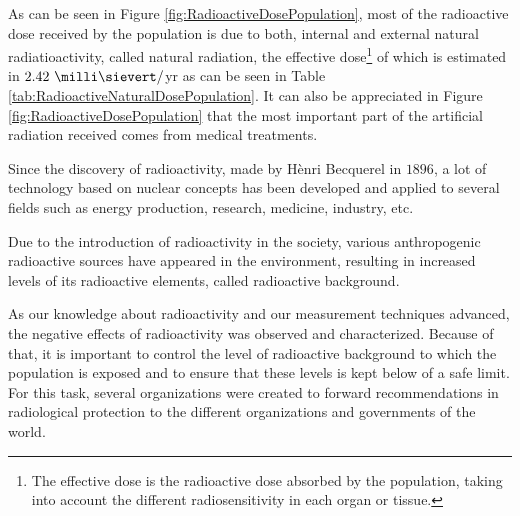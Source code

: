 As can be seen in Figure \ref{fig:RadioactiveDosePopulation}, most of the radioactive dose received by the population is due to both, internal and external natural radiatioactivity, called natural radiation, the effective dose\footnote{The effective dose is the radioactive dose absorbed by the population, taking into account the different radiosensitivity in each organ or tissue.} of which is estimated in $2.42~\milli\sievert/$yr as can be seen in Table \ref{tab:RadioactiveNaturalDosePopulation}. It can also be appreciated in Figure \ref{fig:RadioactiveDosePopulation} that the most important part of the artificial radiation received comes from medical treatments. 

Since the discovery of radioactivity, made by Hènri Becquerel in $1896$, a lot of technology based on nuclear concepts has been developed and applied to several fields such as energy production, research, medicine, industry, etc. 

Due to the introduction of radioactivity in the society, various anthropogenic radioactive sources have appeared in the environment, resulting in increased levels of its radioactive elements, called radioactive background. 

As our knowledge about radioactivity and our measurement techniques advanced, the negative effects of radioactivity was observed and characterized. Because of that, it is important to control the level of radioactive background to which the population is exposed and to ensure that these levels is kept below of a safe limit. For this task, several organizations were created to forward recommendations in radiological protection to the different organizations and governments of the world.


